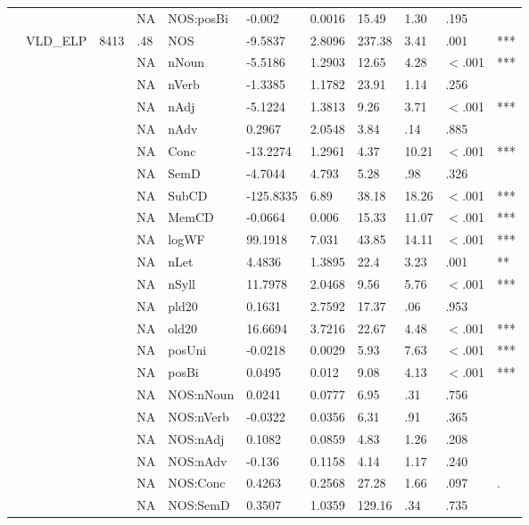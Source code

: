 \begin{table}[ht]
\begin{tabular}{lllllllllll}
   &  &  & NA & NOS:posBi & -0.002 & 0.0016 & 15.49 & 1.30 & .195 &   \\ 
   & VLD\_ELP & 8413 & .48 & NOS & -9.5837 & 2.8096 & 237.38 & 3.41 & .001 & *** \\ 
   &  &  & NA & nNoun & -5.5186 & 1.2903 & 12.65 & 4.28 & $<$.001 & *** \\ 
   &  &  & NA & nVerb & -1.3385 & 1.1782 & 23.91 & 1.14 & .256 &   \\ 
   &  &  & NA & nAdj & -5.1224 & 1.3813 & 9.26 & 3.71 & $<$.001 & *** \\ 
   &  &  & NA & nAdv & 0.2967 & 2.0548 & 3.84 & .14 & .885 &   \\ 
   &  &  & NA & Conc & -13.2274 & 1.2961 & 4.37 & 10.21 & $<$.001 & *** \\ 
   &  &  & NA & SemD & -4.7044 & 4.793 & 5.28 & .98 & .326 &   \\ 
   &  &  & NA & SubCD & -125.8335 & 6.89 & 38.18 & 18.26 & $<$.001 & *** \\ 
   &  &  & NA & MemCD & -0.0664 & 0.006 & 15.33 & 11.07 & $<$.001 & *** \\ 
   &  &  & NA & logWF & 99.1918 & 7.031 & 43.85 & 14.11 & $<$.001 & *** \\ 
   &  &  & NA & nLet & 4.4836 & 1.3895 & 22.4 & 3.23 & .001 & ** \\ 
   &  &  & NA & nSyll & 11.7978 & 2.0468 & 9.56 & 5.76 & $<$.001 & *** \\ 
   &  &  & NA & pld20 & 0.1631 & 2.7592 & 17.37 & .06 & .953 &   \\ 
   &  &  & NA & old20 & 16.6694 & 3.7216 & 22.67 & 4.48 & $<$.001 & *** \\ 
   &  &  & NA & posUni & -0.0218 & 0.0029 & 5.93 & 7.63 & $<$.001 & *** \\ 
   &  &  & NA & posBi & 0.0495 & 0.012 & 9.08 & 4.13 & $<$.001 & *** \\ 
   &  &  & NA & NOS:nNoun & 0.0241 & 0.0777 & 6.95 & .31 & .756 &   \\ 
   &  &  & NA & NOS:nVerb & -0.0322 & 0.0356 & 6.31 & .91 & .365 &   \\ 
   &  &  & NA & NOS:nAdj & 0.1082 & 0.0859 & 4.83 & 1.26 & .208 &   \\ 
   &  &  & NA & NOS:nAdv & -0.136 & 0.1158 & 4.14 & 1.17 & .240 &   \\ 
   &  &  & NA & NOS:Conc & 0.4263 & 0.2568 & 27.28 & 1.66 & .097 & . \\ 
   &  &  & NA & NOS:SemD & 0.3507 & 1.0359 & 129.16 & .34 & .735 &   \\ 

\end{tabular}
\end{table}
